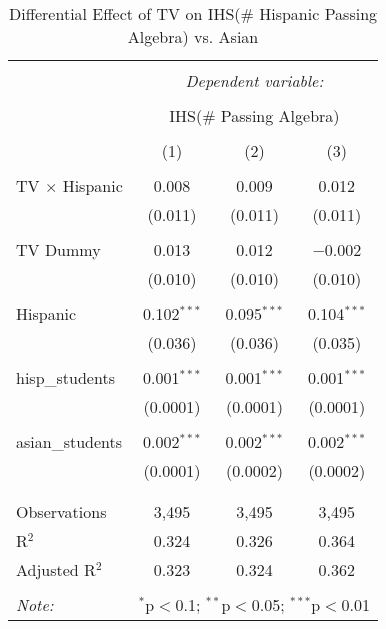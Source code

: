
\begin{table}[!htbp] \centering 
  \caption{Differential Effect of TV on IHS(\# Hispanic Passing Algebra) vs. Asian} 
  \label{} 
\begin{tabular}{@{\extracolsep{-2pt}}lccc} 
\\[-1.8ex]\hline 
\hline \\[-1.8ex] 
 & \multicolumn{3}{c}{\textit{Dependent variable:}} \\ 
\cline{2-4} 
\\[-1.8ex] & \multicolumn{3}{c}{IHS(\# Passing Algebra)} \\ 
\\[-1.8ex] & (1) & (2) & (3)\\ 
\hline \\[-1.8ex] 
 TV $\times$ Hispanic & 0.008 & 0.009 & 0.012 \\ 
  & (0.011) & (0.011) & (0.011) \\ 
  & & & \\ 
 TV Dummy & 0.013 & 0.012 & $-$0.002 \\ 
  & (0.010) & (0.010) & (0.010) \\ 
  & & & \\ 
 Hispanic & 0.102$^{***}$ & 0.095$^{***}$ & 0.104$^{***}$ \\ 
  & (0.036) & (0.036) & (0.035) \\ 
  & & & \\ 
 hisp\_students & 0.001$^{***}$ & 0.001$^{***}$ & 0.001$^{***}$ \\ 
  & (0.0001) & (0.0001) & (0.0001) \\ 
  & & & \\ 
 asian\_students & 0.002$^{***}$ & 0.002$^{***}$ & 0.002$^{***}$ \\ 
  & (0.0001) & (0.0002) & (0.0002) \\ 
  & & & \\ 
\hline \\[-1.8ex] 
Observations & 3,495 & 3,495 & 3,495 \\ 
R$^{2}$ & 0.324 & 0.326 & 0.364 \\ 
Adjusted R$^{2}$ & 0.323 & 0.324 & 0.362 \\ 
\hline 
\hline \\[-1.8ex] 
\textit{Note:}  & \multicolumn{3}{r}{$^{*}$p$<$0.1; $^{**}$p$<$0.05; $^{***}$p$<$0.01} \\ 
\end{tabular} 
\end{table} 
